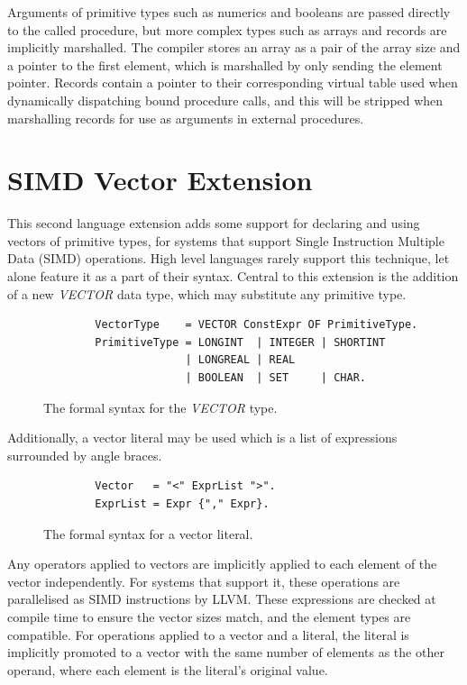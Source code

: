 \documentclass[a4paper,11pt]{article}
\begin{document}
    \noindent
    Arguments of primitive types such as numerics and booleans are passed directly to the called procedure, but more complex types such as arrays and records are implicitly marshalled. The compiler stores an array as a pair of the array size and a pointer to the first element, which is marshalled by only sending the element pointer. Records contain a pointer to their corresponding virtual table used when dynamically dispatching bound procedure calls, and this will be stripped when marshalling records for use as arguments in external procedures.

    \section{SIMD Vector Extension}
    This second language extension adds some support for declaring and using vectors of primitive types, for systems that support Single Instruction Multiple Data (SIMD) operations. High level languages rarely support this technique, let alone feature it as a part of their syntax. Central to this extension is the addition of a new \emph{VECTOR} data type, which may substitute any primitive type.

    \begin{figure}[!htbp]
    \begin{lstlisting}
        VectorType    = VECTOR ConstExpr OF PrimitiveType.
        PrimitiveType = LONGINT  | INTEGER | SHORTINT
                      | LONGREAL | REAL 
                      | BOOLEAN  | SET     | CHAR.
    \end{lstlisting}
    \caption{The formal syntax for the \emph{VECTOR} type.}
    \end{figure}

    \noindent
    Additionally, a vector literal may be used which is a list of expressions surrounded by angle braces.
    
    \begin{figure}[!htbp]
    \begin{lstlisting}
        Vector   = "<" ExprList ">".
        ExprList = Expr {"," Expr}.
    \end{lstlisting}
    \caption{The formal syntax for a vector literal.}
    \end{figure}

    \noindent
    Any operators applied to vectors are implicitly applied to each element of the vector independently. For systems that support it, these operations are parallelised as SIMD instructions by LLVM. These expressions are checked at compile time to ensure the vector sizes match, and the element types are compatible. For operations applied to a vector and a literal, the literal is implicitly promoted to a vector with the same number of elements as the other operand, where each element is the literal's original value.
\end{document}
